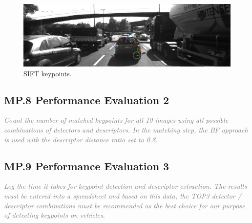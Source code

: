 \documentclass[a4paper]{scrartcl}
\begin{document}
\begin{figure}
	\centering
	\includegraphics[width=0.8\columnwidth]{./keypoints/SIFT}
	\caption{SIFT keypoints.}
	\label{fig:sift_keypoints}
\end{figure}

\subsection*{MP.8 Performance Evaluation 2}
\textcolor{gray}{\textit{Count the number of matched keypoints for all 10 images using all possible combinations of detectors and descriptors. In the matching step, the BF approach is used with the descriptor distance ratio set to 0.8.}}


\subsection*{MP.9 Performance Evaluation 3}
\textcolor{gray}{\textit{Log the time it takes for keypoint detection and descriptor extraction. The results must be entered into a spreadsheet and based on this data, the TOP3 detector / descriptor combinations must be recommended as the best choice for our purpose of detecting keypoints on vehicles.}}
\end{document}
